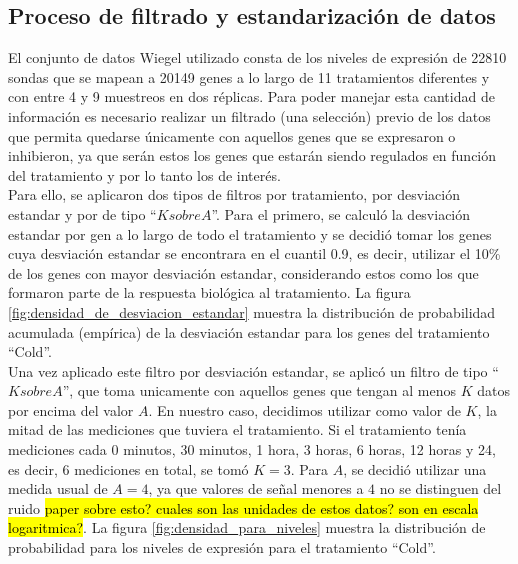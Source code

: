 \subsection{Proceso de filtrado y estandarización de datos}
El conjunto de datos Wiegel utilizado consta de los niveles de expresión de 22810 sondas que se mapean a 20149 genes a lo largo de 11 tratamientos diferentes y con entre 4 y 9 muestreos en dos réplicas. Para poder manejar esta cantidad de información es necesario realizar un filtrado (una selección) previo de los datos que permita quedarse únicamente con aquellos genes que se expresaron o inhibieron, ya que serán estos los genes que estarán siendo regulados en función del tratamiento y por lo tanto los de interés.\\
Para ello, se aplicaron dos tipos de filtros por tratamiento, por desviación estandar y por de tipo ``$K sobre A$''. Para el primero, se calculó la desviación estandar por gen a lo largo de todo el tratamiento y se decidió tomar los genes cuya desviación estandar se encontrara en el cuantil 0.9, es decir, utilizar el 10\% de los genes con mayor desviación estandar, considerando estos como los que formaron parte de la respuesta biológica al tratamiento. La figura \ref{fig:densidad_de_desviacion_estandar} muestra la distribución de probabilidad acumulada (empírica) de la desviación estandar para los genes del tratamiento ``Cold''.\\
Una vez aplicado este filtro por desviación estandar, se aplicó un filtro de tipo ``$K sobre A$'', que toma unicamente con aquellos genes que tengan al menos $K$ datos por encima del valor $A$. En nuestro caso, decidimos utilizar como valor de $K$, la mitad de las mediciones que tuviera el tratamiento. Si el tratamiento tenía mediciones cada 0 minutos, 30 minutos, 1 hora, 3 horas, 6 horas, 12 horas y 24, es decir, 6 mediciones en total, se tomó $K = 3$. Para $A$, se decidió utilizar una medida usual de $A=4$, ya que valores de señal menores a $4$ no se distinguen del ruido \hl{paper sobre esto? cuales son las unidades de estos datos? son en escala logaritmica?}. La figura \ref{fig:densidad_para_niveles} muestra la distribución de probabilidad para los niveles de expresión para el tratamiento ``Cold''.
